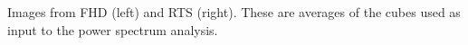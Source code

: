 Images from FHD (left) and RTS (right). These are averages of the cubes used as input to the power spectrum analysis.